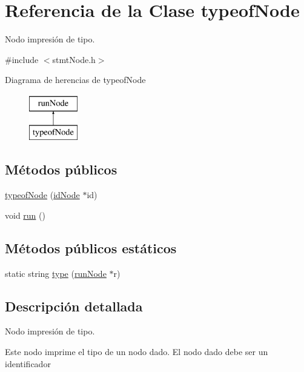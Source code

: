 \hypertarget{classtypeofNode}{\section{Referencia de la Clase typeof\-Node}
\label{classtypeofNode}
}


Nodo impresión de tipo.  




{\ttfamily \#include $<$stmt\-Node.\-h$>$}

Diagrama de herencias de typeof\-Node\begin{figure}[H]
\begin{center}
\leavevmode
\includegraphics[height=2.000000cm]{classtypeofNode}
\end{center}
\end{figure}
\subsection*{Métodos públicos}
\begin{DoxyCompactItemize}
\item 
\hyperlink{classtypeofNode_a88a71f08d4fd2ab2b8da59556901f7c8}{typeof\-Node} (\hyperlink{classidNode}{id\-Node} $\ast$id)
\item 
void \hyperlink{classtypeofNode_af20d8079022f6227d5403c5d2fc58527}{run} ()
\end{DoxyCompactItemize}
\subsection*{Métodos públicos estáticos}
\begin{DoxyCompactItemize}
\item 
static string \hyperlink{classtypeofNode_ae954588348173d1a51aa9052927443c2}{type} (\hyperlink{classrunNode}{run\-Node} $\ast$r)
\end{DoxyCompactItemize}


\subsection{Descripción detallada}
Nodo impresión de tipo. 

Este nodo imprime el tipo de un nodo dado. El nodo dado debe ser un identificador 

